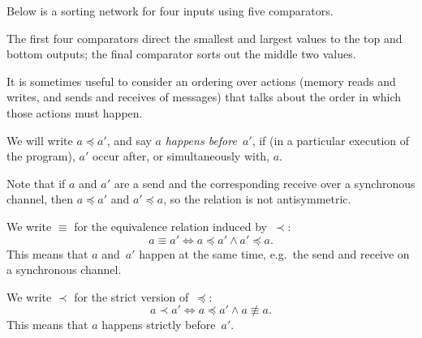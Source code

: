 \documentclass[notes,color]{sepslide0}
\def\comp#1#2#3{%
  \draw (#1)+(#3,0) node {$\bullet$};
  \draw (#2)+(#3,0) node (n2) {$\bullet$};
  \draw[thick] (#1)+(#3,0) -- (n2.center);
}
\begin{document}

\begin{slide}

Below is a sorting network for four inputs using five comparators.
%
\begin{center}
\end{center}
%
The first four comparators direct the smallest and largest values to the top
and bottom outputs; the final comparator sorts out the middle two values.
\end{slide}


\begin{slide}

It is sometimes useful to consider an ordering over actions (memory reads and
writes, and sends and receives of messages) that talks about the order in
which those actions must happen.

We will write $a \preceq a'$, and say $a$ \emph{happens before}~$a'$, if (in a
particular execution of the program), $a'$ occur after, or simultaneously
with, $a$.

Note that if $a$ and $a'$ are a send and the corresponding receive over a
synchronous channel, then $a \preceq a'$ and $a' \preceq a$, so the relation
is not antisymmetric. 
\end{slide}


\begin{slide}

We write $\equiv$ for the equivalence relation induced by~$\prec$:
\[
a \equiv a' \iff a \preceq a' \land a' \preceq a.
\]
This means that $a$ and~$a'$ happen at the same time, e.g.~the send and
receive on a synchronous channel.

We write $\prec$ for the strict version of~$\preceq$:
\[
a \prec a' \iff a \preceq a' \land a \not\equiv a.
\]
This means that $a$ happens strictly before~$a'$.
\end{slide}
\end{document}
